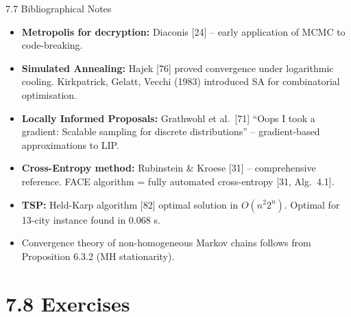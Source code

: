 \documentclass[aspectratio=169,10pt]{beamer}
\begin{document}
\begin{frame}{7.7 Bibliographical Notes}
  \begin{itemize}
    \item \textbf{Metropolis for decryption:}
      Diaconis [24] -- early application of MCMC to code-breaking.
    \item \textbf{Simulated Annealing:}
      Hajek [76] proved convergence under logarithmic cooling.
      Kirk\-patrick, Gelatt, Vecchi (1983) introduced SA for combinatorial
      optimisation.
    \item \textbf{Locally Informed Proposals:}
      Grathwohl et al.\ [71] ``Oops I took a gradient: Scalable sampling
      for discrete distributions'' -- gradient-based approximations to LIP.
    \item \textbf{Cross-Entropy method:}
      Rubinstein \& Kroese [31] -- comprehensive reference.
      FACE algorithm = fully automated cross-entropy [31, Alg.~4.1].
    \item \textbf{TSP:}
      Held-Karp algorithm [82] optimal solution in $O(n^2 2^n)$.
      Optimal for 13-city instance found in 0.068 s.
    \item Convergence theory of non-homogeneous Markov chains follows from
      Proposition 6.3.2 (MH stationarity).
  \end{itemize}
\end{frame}

\section{7.8 Exercises}
\end{document}
